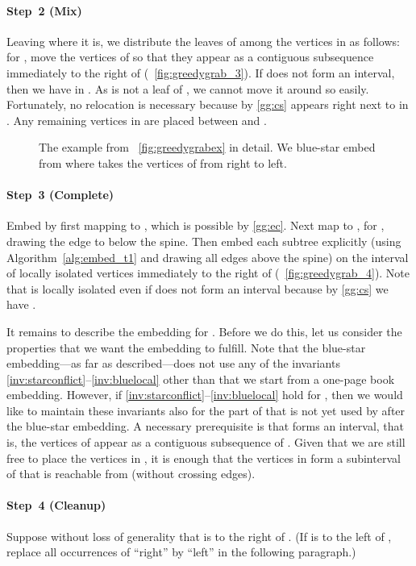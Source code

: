 \documentclass[11pt,a4paper,colorlinks=true,urlcolor=blue,citecolor=red]{article}
\theoremstyle{plain}
\newcommand{\subsubparagraph}[1]{\paragraph{#1}}
\begin{document}
\subsubparagraph{Step~2 (Mix)} Leaving  where it is, we
distribute the leaves of  among the vertices in  as
follows: for , move the vertices of  so that
they appear as a contiguous subsequence immediately to the right of
 (\figurename~\ref{fig:greedygrab_3}). If
 does not form an interval, then we have
 in . As  is not a leaf of , we cannot move it
around so easily. Fortunately, no relocation is necessary because by
\ref{gg:cs}  appears right next to  in . Any
remaining vertices in  are placed between  and .
\begin{figure}[htbp]
  \centering\hfil {}\hfil
  \hfil
  \hfil
  \hfil
  \caption{The example from \figurename~\ref{fig:greedygrabex} in
    detail. We blue-star embed  from  where 
    takes the vertices of  from right to
    left.\label{fig:greedygrab}}
\end{figure}


\subsubparagraph{Step~3 (Complete)} Embed  by first mapping  to
, which is possible by \ref{gg:ec}. Next map  to , for
, drawing the edge to  below the spine. Then
embed each subtree  explicitly (using
Algorithm~\ref{alg:embed_t1} and drawing all edges above the spine) on
the interval of  locally isolated vertices immediately to
the right of  (\figurename~\ref{fig:greedygrab_4}). Note that
 is locally isolated even if
 does not form an interval because by
\ref{gg:cs} we have .

It remains to describe the embedding for . Before we do this,
let us consider the properties that we want the embedding to fulfill.
Note that the blue-star embedding---as far as described---does not use
any of the invariants \ref{inv:starconflict}--\ref{inv:bluelocal} other
than that we start from a one-page book embedding. However, if
\ref{inv:starconflict}--\ref{inv:bluelocal} hold for , then we would
like to maintain these invariants also for the part
 of 
that is not yet used by  after the blue-star embedding. A necessary
prerequisite is that  forms an interval, that is, the vertices of
 appear as a contiguous subsequence of . Given that we are
still free to place the vertices in , it is enough that the
vertices in  form a subinterval of  that is
reachable from  (without crossing edges).

\subsubparagraph{Step~4 (Cleanup)} Suppose without loss of generality
that  is to the right of . (If  is
to the left of , replace all occurrences of
``right'' by ``left'' in the following paragraph.)
\end{document}

